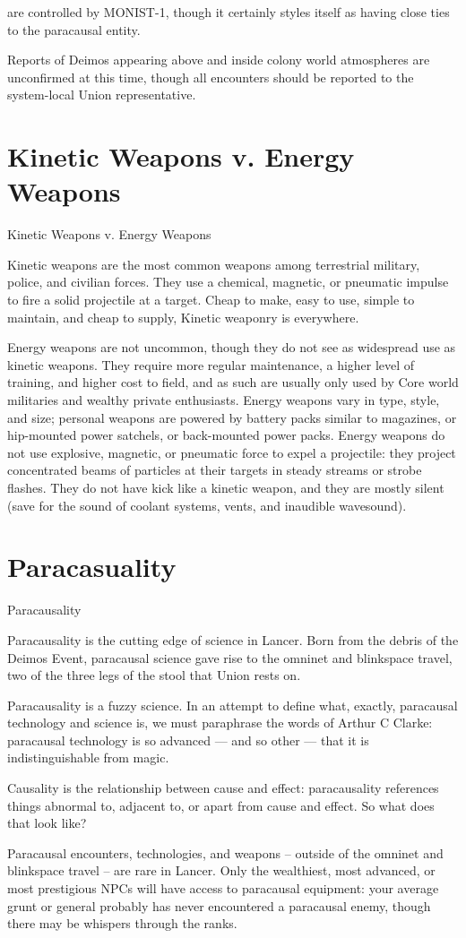 are controlled by MONIST-1, though it certainly styles itself as having close ties to the paracausal
entity.


Reports of Deimos appearing above and inside colony world atmospheres are unconfirmed at
this time, though all encounters should be reported to the system-local Union representative.

\section{Kinetic Weapons v. Energy Weapons}
Kinetic Weapons v. Energy Weapons

Kinetic weapons are the most common weapons among terrestrial military, police, and civilian
forces. They use a chemical, magnetic, or pneumatic impulse to fire a solid projectile at a target.
Cheap to make, easy to use, simple to maintain, and cheap to supply, Kinetic weaponry is
everywhere.


Energy weapons are not uncommon, though they do not see as widespread use as kinetic
weapons. They require more regular maintenance, a higher level of training, and higher cost to
field, and as such are usually only used by Core world militaries and wealthy private enthusiasts.
Energy weapons vary in type, style, and size; personal weapons are powered by battery packs
similar to magazines, or hip-mounted power satchels, or back-mounted power packs. Energy
weapons do not use explosive, magnetic, or pneumatic force to expel a projectile: they project
concentrated beams of particles at their targets in steady streams or strobe flashes. They do not
have kick like a kinetic weapon, and they are mostly silent (save for the sound of coolant
systems, vents, and inaudible wavesound).

\section{Paracasuality}
Paracausality

Paracausality is the cutting edge of science in Lancer. Born from the debris of the Deimos Event,
paracausal science gave rise to the omninet and blinkspace travel, two of the three legs of the
stool that Union rests on.


Paracausality is a fuzzy science. In an attempt to define what, exactly, paracausal technology
and science is, we must paraphrase the words of Arthur C Clarke: paracausal technology is so
advanced — and so other — that it is indistinguishable from magic.


Causality is the relationship between cause and effect: paracausality references things abnormal
to, adjacent to, or apart from cause and effect. So what does that look like?


Paracausal encounters, technologies, and weapons -- outside of the omninet and blinkspace
travel -- are rare in Lancer. Only the wealthiest, most advanced, or most prestigious NPCs will
have access to paracausal equipment: your average grunt or general probably has never
encountered a paracausal enemy, though there may be whispers through the ranks.






